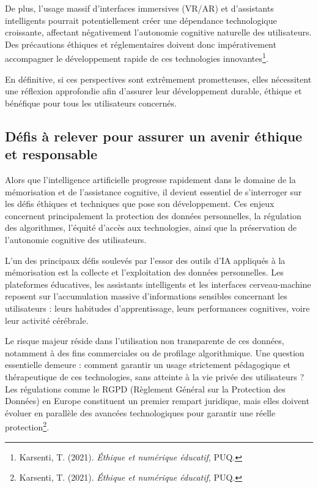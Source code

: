 \documentclass[12pt,a4paper]{report}
\begin{document}
De plus, l’usage massif d’interfaces immersives (VR/AR) et d’assistants intelligents pourrait potentiellement créer une dépendance technologique croissante, affectant négativement l’autonomie cognitive naturelle des utilisateurs. Des précautions éthiques et réglementaires doivent donc impérativement accompagner le développement rapide de ces technologies innovantes\footnote{Karsenti, T. (2021). \textit{Éthique et numérique éducatif}, PUQ.}.

En définitive, si ces perspectives sont extrêmement prometteuses, elles nécessitent une réflexion approfondie afin d’assurer leur développement durable, éthique et bénéfique pour tous les utilisateurs concernés.

\subsection{Défis à relever pour assurer un avenir éthique et responsable}

Alors que l’intelligence artificielle progresse rapidement dans le domaine de la mémorisation et de l’assistance cognitive, il devient essentiel de s’interroger sur les défis éthiques et techniques que pose son développement. Ces enjeux concernent principalement la protection des données personnelles, la régulation des algorithmes, l’équité d’accès aux technologies, ainsi que la préservation de l’autonomie cognitive des utilisateurs.

L’un des principaux défis soulevés par l’essor des outils d’IA appliqués à la mémorisation est la collecte et l’exploitation des données personnelles. Les plateformes éducatives, les assistants intelligents et les interfaces cerveau-machine reposent sur l’accumulation massive d’informations sensibles concernant les utilisateurs : leurs habitudes d’apprentissage, leurs performances cognitives, voire leur activité cérébrale.

Le risque majeur réside dans l’utilisation non transparente de ces données, notamment à des fins commerciales ou de profilage algorithmique. Une question essentielle demeure : comment garantir un usage strictement pédagogique et thérapeutique de ces technologies, sans atteinte à la vie privée des utilisateurs ? Les régulations comme le RGPD (Règlement Général sur la Protection des Données) en Europe constituent un premier rempart juridique, mais elles doivent évoluer en parallèle des avancées technologiques pour garantir une réelle protection\footnote{Karsenti, T. (2021). \textit{Éthique et numérique éducatif}, PUQ.}.
\end{document}
